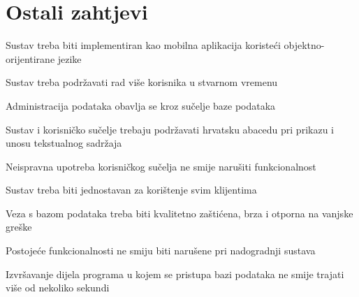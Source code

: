		\section{Ostali zahtjevi}
		 
			\begin{packed_item}

				\item  Sustav treba biti implementiran kao mobilna aplikacija koristeći objektno-orijentirane jezike
				\item  Sustav treba podržavati rad više korisnika u stvarnom vremenu
				\item  Administracija podataka obavlja se kroz sučelje baze podataka
				\item  Sustav i korisničko sučelje trebaju podržavati hrvatsku abacedu pri prikazu i unosu tekstualnog sadržaja
				\item  Neispravna upotreba korisničkog sučelja ne smije narušiti funkcionalnost
				\item  Sustav treba biti jednostavan za korištenje svim klijentima
				\item  Veza s bazom podataka treba biti kvalitetno zaštićena, brza i otporna na vanjske greške
				\item  Postojeće funkcionalnosti ne smiju biti narušene pri nadogradnji sustava
				\item  Izvršavanje dijela programa u kojem se pristupa bazi podataka ne smije trajati više od nekoliko sekundi

			\end{packed_item}
			 
			 
			 
	